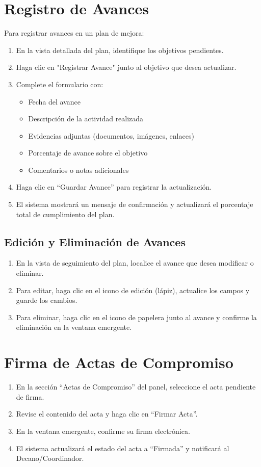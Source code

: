 \documentclass[12pt,a4paper]{book}
\begin{document}
\section{Registro de Avances}
Para registrar avances en un plan de mejora:
\begin{enumerate}
  \item En la vista detallada del plan, identifique los objetivos pendientes.
  \item Haga clic en "Registrar Avance" junto al objetivo que desea actualizar.
  \item Complete el formulario con:
    \begin{itemize}
      \item Fecha del avance
      \item Descripción de la actividad realizada
      \item Evidencias adjuntas (documentos, imágenes, enlaces)
      \item Porcentaje de avance sobre el objetivo
      \item Comentarios o notas adicionales
    \end{itemize}
  \item Haga clic en ``Guardar Avance'' para registrar la actualización.
  \item El sistema mostrará un mensaje de confirmación y actualizará el porcentaje total de cumplimiento del plan.
\end{enumerate}
    
\subsection{Edición y Eliminación de Avances}
\begin{enumerate}
        \item En la vista de seguimiento del plan, localice el avance que desea modificar o eliminar.
        \item Para editar, haga clic en el icono de edición (lápiz), actualice los campos y guarde los cambios.
    \item Para eliminar, haga clic en el icono de papelera junto al avance y confirme la eliminación en la ventana emergente.
\end{enumerate}
    
\section{Firma de Actas de Compromiso}
\begin{enumerate}
    \item En la sección “Actas de Compromiso” del panel, seleccione el acta pendiente de firma.
    \item Revise el contenido del acta y haga clic en “Firmar Acta”.
    \item En la ventana emergente, confirme su firma electrónica.
    \item El sistema actualizará el estado del acta a “Firmada” y notificará al Decano/Coordinador.
\end{enumerate}
    
\end{document}
